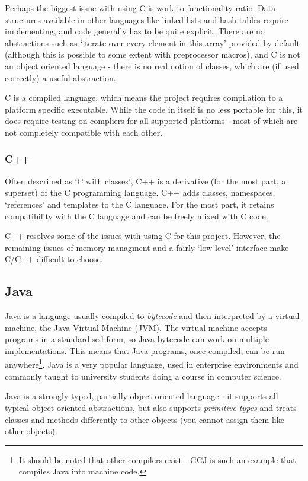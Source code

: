\documentclass[10pt,a4paper,notitlepage]{report}
\begin{document}
Perhaps the biggest issue with using C is work to functionality ratio. Data structures available in other languages like linked lists and hash tables require implementing, and code generally has to be quite explicit. There are no abstractions such as `iterate over every element in this array' provided by default (although this is possible to some extent with preprocessor macros), and C is not an object oriented language - there is no real notion of classes, which are (if used correctly) a useful abstraction.

C is a compiled language, which means the project requires compilation to a platform specific executable. While the code in itself is no less portable for this, it does require testing on compliers for all supported platforms - most of which are not completely compatible with each other.

\subsubsection{C++}
Often described as `C with classes', C++ is a derivative (for the most part, a superset) of the C programming language\cite{tcpppl}.
C++ adds classes, namespaces, `references' and templates to the C language. For the most part, it retains compatibility with the C language and can be freely mixed with C code.

C++ resolves some of the issues with using C for this project. However, the remaining issues of memory managment and a fairly `low-level' interface make C/C++ difficult to choose.

\subsection{Java}
Java is a language usually compiled to \emph{bytecode} and then interpreted by a virtual machine, the Java Virtual Machine (JVM). The virtual machine accepts programs in a standardised form, so Java bytecode can work on multiple implementations. This means that Java programs, once compiled, can be run anywhere\footnote{It should be noted that other compilers exist - GCJ\cite{gcj} is such an example that compiles Java into machine code.}. Java is a very popular language\cite{javatech}, used in enterprise environments and commonly taught to university students doing a course in computer science.

Java is a strongly typed, partially object oriented language - it supports all typical object oriented abstractions, but also supports \emph{primitive types} and treats classes and methods differently to other objects (you cannot assign them like other objects).
\end{document}
